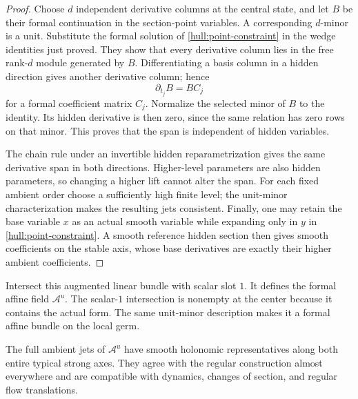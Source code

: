 \begin{proof}
Choose $d$ independent derivative columns at the central state, and
let $B$ be their formal continuation in the section-point variables.
A corresponding $d$-minor is a unit. Substitute the formal solution
of \eqref{hull:point-constraint} in the wedge identities just proved.
They show that every derivative column lies in the free rank-$d$
module generated by $B$. Differentiating a basis column in a hidden
direction gives another derivative column; hence
\[
 \partial_{t_j}B=B C_j
\]
for a formal coefficient matrix $C_j$. Normalize the selected minor
of $B$ to the identity. Its hidden derivative is then zero, since
the same relation has zero rows on that minor. This proves that the
span is independent of hidden variables.

The chain rule under an invertible hidden reparametrization gives
the same derivative span in both directions. Higher-level parameters
are also hidden parameters, so changing a higher lift cannot alter
the span. For each fixed ambient order choose a sufficiently high
finite level; the unit-minor characterization makes the resulting
jets consistent. Finally, one may retain the base variable $x$ as
an actual smooth variable while expanding only in $y$ in
\eqref{hull:point-constraint}. A smooth reference hidden section
then gives smooth coefficients on the stable axis, whose base
derivatives are exactly their higher ambient coefficients.
\end{proof}

Intersect this augmented linear bundle with scalar slot $1$. It
defines the formal affine field $\mathcal A^u$. The scalar-$1$
intersection is nonempty at the center because it contains the actual
form. The same unit-minor description makes it a formal affine
bundle on the local germ.

\begin{lemma}\label{hull:coherence}
The full ambient jets of $\mathcal A^u$ have smooth holonomic
representatives along both entire typical strong axes. They agree
with the regular construction almost everywhere and are compatible
with dynamics, changes of section, and regular flow translations.
\end{lemma}

